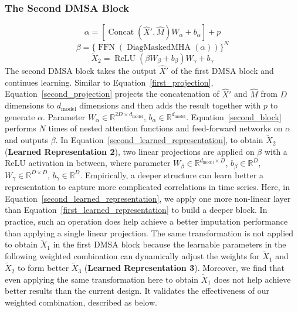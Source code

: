 \documentclass{article}
\begin{document}
\subsubsection{The Second DMSA Block} \label{SAITS: the 2nd block}
\begin{equation}
	\label{second_projection}
	\alpha = \left[\operatorname{Concat}\left(\hat{X}', \hat{M}\right) W_{\alpha} + b_{\alpha}\right] + p
\end{equation} 
\begin{equation} 
	\label{second_block}
	\beta = \{\operatorname{FFN}\left(\operatorname{DiagMaskedMHA}\left(\alpha\right)\right)\}^N
\end{equation}
\begin{equation} 
	\label{second_learned_representation}
	\tilde{X}_2 = \operatorname{ReLU}\left(\beta W_{\beta} + b_{\beta}\right) W_{\gamma} + b_{\gamma}
\end{equation} 
The second DMSA block takes the output $\hat{X}'$ of the first DMSA block and continues learning. Similar to Equation~\ref{first_projection}, Equation~\ref{second_projection} projects the concatenation of $\hat{X}'$ and $\hat{M}$ from $D$ dimensions to $d_{\text{model}}$ dimensions and then adds the result together with $p$ to generate $\alpha$. Parameter $W_\alpha \in \mathbb{R}^{2D \times d_{\text{model}}}$, $b_\alpha \in \mathbb{R}^{d_{\text{model}}}$. Equation~\ref{second_block} performs $N$ times of nested attention functions and feed-forward networks on $\alpha$ and outputs $\beta$. In Equation~\ref{second_learned_representation}, to obtain $\tilde{X}_2$ (\textbf{Learned Representation 2}), two linear projections are applied on $\beta$ with a ReLU activation in between, where parameter $W_\beta \in \mathbb{R}^{d_{\text{model}} \times D}$, $b_\beta \in \mathbb{R}^{D}$, $W_\gamma \in \mathbb{R}^{D \times D}$, $b_\gamma \in \mathbb{R}^{D}$. Empirically, a deeper structure can learn better a representation to capture more complicated correlations in time series. Here, in Equation~\ref{second_learned_representation}, we apply one more non-linear layer than Equation~\ref{first_learned_representation} to build a deeper block. In practice, such an operation does help achieve a better imputation performance than applying a single linear projection. The same transformation is not applied to obtain $\tilde{X}_1$ in the first DMSA block because the learnable parameters in the following weighted combination can dynamically adjust the weights for $\tilde{X}_1$ and $\tilde{X}_2$ to form better $\tilde{X}_3$ (\textbf{Learned Representation 3}). Moreover, we find that even applying the same transformation here to obtain $\tilde{X}_1$ does not help achieve better results than the current design. It validates the effectiveness of our weighted combination, described as below.
\end{document}
